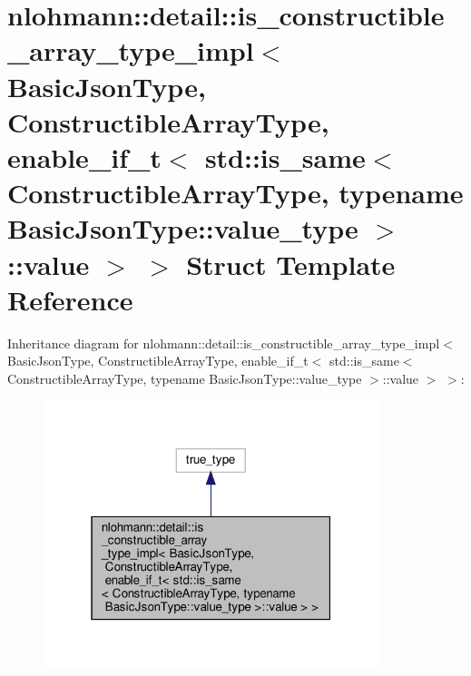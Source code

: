 \hypertarget{structnlohmann_1_1detail_1_1is__constructible__array__type__impl_3_01BasicJsonType_00_01Construce6fa33688da703b95649da4749cdeb98}{}\section{nlohmann\+:\+:detail\+:\+:is\+\_\+constructible\+\_\+array\+\_\+type\+\_\+impl$<$ Basic\+Json\+Type, Constructible\+Array\+Type, enable\+\_\+if\+\_\+t$<$ std\+:\+:is\+\_\+same$<$ Constructible\+Array\+Type, typename Basic\+Json\+Type\+:\+:value\+\_\+type $>$\+:\+:value $>$ $>$ Struct Template Reference}
\label{structnlohmann_1_1detail_1_1is__constructible__array__type__impl_3_01BasicJsonType_00_01Construce6fa33688da703b95649da4749cdeb98}


Inheritance diagram for nlohmann\+:\+:detail\+:\+:is\+\_\+constructible\+\_\+array\+\_\+type\+\_\+impl$<$ Basic\+Json\+Type, Constructible\+Array\+Type, enable\+\_\+if\+\_\+t$<$ std\+:\+:is\+\_\+same$<$ Constructible\+Array\+Type, typename Basic\+Json\+Type\+:\+:value\+\_\+type $>$\+:\+:value $>$ $>$\+:\nopagebreak
\begin{figure}[H]
\begin{center}
\leavevmode
\includegraphics[width=277pt]{structnlohmann_1_1detail_1_1is__constructible__array__type__impl_3_01BasicJsonType_00_01Construca6751f0ccf983945799627775f5c1958}
\end{center}
\end{figure}


